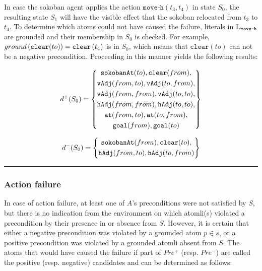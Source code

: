 \documentclass[\master/Master.tex]{subfiles}
\begin{document}
\begin{example} \label{ex:moveSucceeded}
    In case the sokoban agent applies the action $\texttt{move-h}(t_3, t_4)$ in state $S_0$, the resulting state $S_1$ will have the visible effect that the sokoban relocated from $t_3$ to $t_4$. To determine which atoms could not have caused the failure, literals in $\mathbb{L}_{\texttt{move-h}}$ are grounded and their membership in $S_0$ is checked. For example, $ground \left( \texttt{clear}(to) \right) = \texttt{clear}\left( t_4 \right)$ is in $S_0$, which means that $\texttt{clear}(to)$ can not be a negative precondition. Proceeding in this manner yields the following results:

    \begin{equation*}
        d^+(S_0) = \left\{
            \begin{gathered}
                \texttt{sokobanAt}(to), \texttt{clear}(from), \\
                \texttt{vAdj}(from, to), \texttt{vAdj}(to, from), \\
                \texttt{vAdj}(from, from), \texttt{vAdj}(to, to), \\
                \texttt{hAdj}(from, from), \texttt{hAdj}(to, to), \\
                \texttt{at}(from, to), \texttt{at}(to, from), \\
                \texttt{goal}(from), \texttt{goal}(to)
            \end{gathered}
        \right\}
    \end{equation*}

    \begin{equation*}
        d^-(S_0) = \left\{
            \begin{gathered}
                \texttt{sokobanAt}(from), \texttt{clear}(to), \\
                \texttt{hAdj}(from, to), \texttt{hAdj}(to, from)
            \end{gathered}
        \right\}
    \end{equation*}

    \noindent\rule{\textwidth}{1pt}
\end{example}

\subsubsection*{Action failure}
In case of action failure, at least one of $A$'s preconditions were not satisfied by $S$, but there is no indication from the environment on which atomli(s) violated a precondition by their presence in or absence from $S$. However, it is certain that either a negative precondition was violated by a grounded atom $p \in s$, or a positive precondition was violated by a grounded atomli absent from $S$. The atoms that would have caused the failure if part of $Pre^+$ (resp. $Pre^-$) are called the positive (resp. negative) candidates and can be determined as follows:
\end{document}
